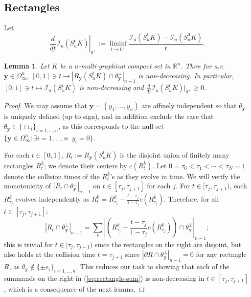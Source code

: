 \documentclass[11pt]{article}
\newtheorem{lemma}[thm]{Lemma}
\theoremstyle{definition}
\theoremstyle{proof}
\newcommand{\dtl}[1]{\left . \underline{\frac{d}{dt}} #1 \right |_{0^+}}
\newcommand{\dtll}[1]{\underline{\frac{d}{dt}} #1 |_{0^+}}
\DeclareMathOperator{\+}{\mathop{\tilde{+}}}
\newcommand{\abs}[1]{\left\vert#1\right\vert}
\newcommand{\brac}[1]{\left(#1\right)}
\newcommand{\R}{\mathbb{R}}
\newcommand{\I}{\mathcal{I}}
\newcommand{\y}{\mathbf{y}}
\numberwithin{equation}{section}
\numberwithin{equation}{section}
\begin{document}
\subsection{Rectangles}

Let
\[
\dtl{\I_u(S_u^t K)} := \liminf_{t \rightarrow 0^+} \frac{\I_u(S_u^t K) - \I_u(S_u^0 K)}{t} . 
\]

\begin{lemma} \label{lem:rectangles-increasing}
Let $K$ be a $u$-multi-graphical compact set in $\R^n$. Then for a.e.~$\y \in \Omega_\infty^n$, $[0,1] \ni t \mapsto |R_\y(S_u^t K) \cap \theta_\y^{\perp}|_{n-1}$ is non-decreasing. In particular, $[0,1] \ni t\mapsto \I_u(S_u^t K)$ is non-decreasing and $\dtll{\I_u(S_u^t K)} \geq 0$. \end{lemma}
\begin{proof}
We may assume that $\y = (y_1,\ldots,y_n)$ are affinely independent so that $\theta_\y$ is uniquely defined (up to sign), and in addition exclude the case that $\theta_\y \in \{\pm e_i\}_{i=1,\ldots,n}$, as this corresponds to the null-set $\{ \y \in \Omega_\infty^n : \exists i =1,\ldots,n \;\; y_i = 0 \}$. 

For each $t \in [0,1]$, $R_t := R_\y(S_u^t K)$ is the disjoint union of finitely many rectangles $R_t^k$; we denote their centers by $c(R_t^k)$.  Let $0 = \tau_0 < \tau_1 < \cdots < \tau_N = 1$ denote the collision times of the $R_t^k$'s as they evolve in time. We will verify the monotonicity of $|R_t \cap \theta_\y^{\perp}|_{n-1}$ on $t \in [\tau_j,\tau_{j+1}]$ for each $j$. 
For $t \in [\tau_j, \tau_{j+1})$, each $R_{\tau_j}^k$ evolves independently as $R_t^k = R_{\tau_j}^k - \frac{t-\tau_j}{1-\tau_j} c(R_{\tau_j}^k)$. 
Therefore, for all $t \in [\tau_j, \tau_{j+1}]$:
\begin{equation} \label{eq:rectangle-sum}
|R_t \cap \theta_\y^{\perp}|_{n-1} = \sum_{k} \abs{\brac{R_{\tau_j}^k - \frac{t-\tau_j}{1-\tau_j} c(R_{\tau_j}^k)} \cap \theta_\y^{\perp}}_{n-1} ;
 \end{equation}
 this is trivial for $t \in [\tau_j,\tau_{j+1})$ since the rectangles on the right are disjoint, but also holds at the collision time $t = \tau_{j+1}$ since $|\partial R \cap \theta_y^{\perp}|_{n-1} = 0$ for any rectangle $R$, as $\theta_\y \notin \{\pm e_i\}_{i=1,\ldots,n}$. This reduces our task to showing that each of the summands on the right in (\ref{eq:rectangle-sum}) is non-decreasing in $t \in [\tau_j,\tau_{j+1}]$, which is a consequence of the next lemma. 
 \end{proof}
 
\end{document}
